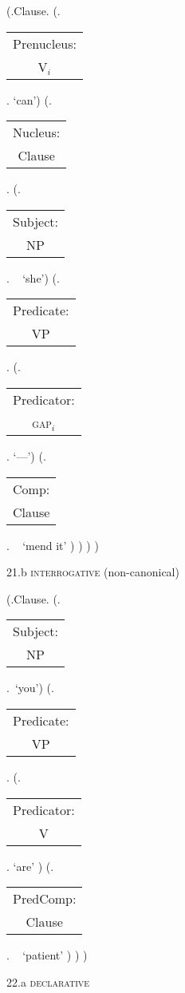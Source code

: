 \documentclass[12pt,letterpaper]{article}
\begin{document}
\begin{figure}
	\begin{center}
		\begin{parsetree}
			(.Clause.
			(.\begin{tabular}{c}Prenucleus:\\V$_i$\end{tabular}. `can')
			(.\begin{tabular}{c}Nucleus:\\Clause\end{tabular}.
			(.\begin{tabular}{c}Subject:\\NP\end{tabular}.  ~ `she')
			(.\begin{tabular}{c}Predicate:\\VP\end{tabular}.
			(.\begin{tabular}{c}Predicator:\\\textsc{gap}$_i$\end{tabular}. `---')
			(.\begin{tabular}{c}Comp:\\Clause\end{tabular}. ~  `mend it' )
			)
			)
			)
			
			\hfill \break\hfill \break
		\end{parsetree}
		21.b \textsc{interrogative} (non-canonical)
	\end{center}
\end{figure}

\begin{figure}
	\begin{center}
		\begin{parsetree}
			(.Clause.
			(.\begin{tabular}{c}Subject:\\NP\end{tabular}.~`you')
			(.\begin{tabular}{c}Predicate:\\VP\end{tabular}.
			(.\begin{tabular}{c}Predicator:\\V\end{tabular}. `are' )
			(.\begin{tabular}{c}PredComp:\\Clause\end{tabular}. ~  `patient' )
			)
			)
			
			\hfill \break\hfill \break
		\end{parsetree}
		22.a \textsc{declarative}
	\end{center}
\end{figure}
\end{document}
